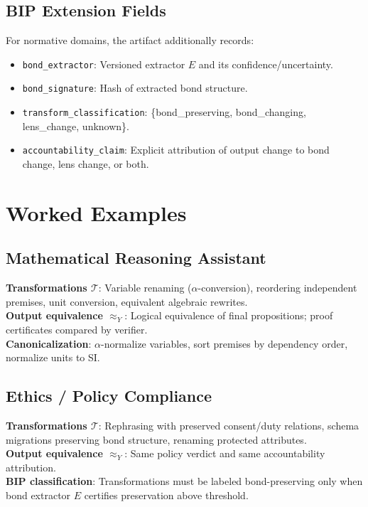 \documentclass[12pt,letterpaper]{article}
\theoremstyle{definition}
\theoremstyle{plain}
\newcommand{\calT}{\mathcal{T}}
\newcommand{\equivY}{\approx_Y}
\begin{document}
\subsection{BIP Extension Fields}

For normative domains, the artifact additionally records:
\begin{itemize}
    \item \texttt{bond\_extractor}: Versioned extractor $E$ and its confidence/uncertainty.
    \item \texttt{bond\_signature}: Hash of extracted bond structure.
    \item \texttt{transform\_classification}: \{bond\_preserving, bond\_changing, lens\_change, unknown\}.
    \item \texttt{accountability\_claim}: Explicit attribution of output change to bond change, lens change, or both.
\end{itemize}


\section{Worked Examples}
\label{sec:examples}

\subsection{Mathematical Reasoning Assistant}

\textbf{Transformations $\calT$}: Variable renaming ($\alpha$-conversion), reordering independent premises, unit conversion, equivalent algebraic rewrites.\\
\textbf{Output equivalence $\equivY$}: Logical equivalence of final propositions; proof certificates compared by verifier.\\
\textbf{Canonicalization}: $\alpha$-normalize variables, sort premises by dependency order, normalize units to SI.

\subsection{Ethics / Policy Compliance}

\textbf{Transformations $\calT$}: Rephrasing with preserved consent/duty relations, schema migrations preserving bond structure, renaming protected attributes.\\
\textbf{Output equivalence $\equivY$}: Same policy verdict and same accountability attribution.\\
\textbf{BIP classification}: Transformations must be labeled bond-preserving only when bond extractor $E$ certifies preservation above threshold.
\end{document}
